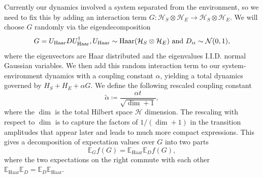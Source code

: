 \documentclass{article}
\newcommand{\haar}{\text{Haar}}
\newcommand{\hilb}{\mathcal{H}}
\begin{document}
Currently our dynamics involved a system separated from the environment, so we need to fix this by adding an interaction term $G : \hilb_S \otimes \hilb_E \to \hilb_S \otimes \hilb_E$. We will choose $G$ randomly via the eigendecomposition 
\begin{equation}
    G = U_{\haar} D U_{\haar}^\dagger, U_{\haar} \sim {\rm Haar}(\hilb_S \otimes \hilb_E) \text{ and } D_{ii} \sim \mathcal{N}(0,1), \label{eq:interaction_def}
\end{equation}
where the eigenvectors are Haar distributed and the eigenvalues I.I.D. normal Gaussian variables. We then add this random interaction term to our system-environment dynamics with a coupling constant $\alpha$, yielding a total dynamics governed by $H_S + H_E + \alpha G$. We define the following rescaled coupling constant 
 \begin{equation}
    \widetilde{\alpha} \coloneqq \frac{\alpha t}{\sqrt{\dim + 1}}, \label{eq:a_tilde_def}
\end{equation}
where the $\dim$ is the total Hilbert space $\hilb$ dimension. The rescaling with respect to $\dim$ is to capture the factors of $1/(\dim + 1)$ in the transition amplitudes that appear later and leads to much more compact expressions.
This gives a decomposition of expectation values over $G$ into two parts 
\begin{equation}
    \mathbb{E}_G f(G) = \mathbb{E}_{\haar} \mathbb{E}_{D} f(G),
\end{equation}
where the two expectations on the right commute with each other $\mathbb{E}_{\haar} \mathbb{E}_{D} = \mathbb{E}_{D} \mathbb{E}_{\haar} $. 
\end{document}
